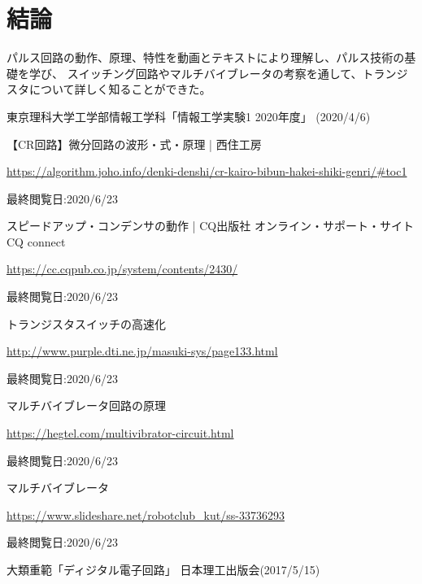 \documentclass[12pt]{jarticle}
\begin{document}
\section{結論}
パルス回路の動作、原理、特性を動画とテキストにより理解し、パルス技術の基礎を学び、
スイッチング回路やマルチバイブレータの考察を通して、トランジスタについて詳しく知ることができた。

\clearpage
\begin{thebibliography}{99}
    \label{sannkoubunnkenn_chapter}
    東京理科大学工学部情報工学科「情報工学実験1 2020年度」
    (2020/4/6)

    【CR回路】微分回路の波形・式・原理  |  西住工房

    \url{https://algorithm.joho.info/denki-denshi/cr-kairo-bibun-hakei-shiki-genri/#toc1}

    最終閲覧日:2020/6/23

    スピードアップ・コンデンサの動作 | CQ出版社 オンライン・サポート・サイト CQ connect

    \url{https://cc.cqpub.co.jp/system/contents/2430/}

    最終閲覧日:2020/6/23

    トランジスタスイッチの高速化

    \url{http://www.purple.dti.ne.jp/masuki-sys/page133.html}

    最終閲覧日:2020/6/23

    マルチバイブレータ回路の原理

    \url{https://hegtel.com/multivibrator-circuit.html}

    最終閲覧日:2020/6/23

    マルチバイブレータ

    \url{https://www.slideshare.net/robotclub_kut/ss-33736293}

    最終閲覧日:2020/6/23

    大類重範「ディジタル電子回路」
    日本理工出版会(2017/5/15)
\end{thebibliography}

\clearpage
\appendix
\end{document}

